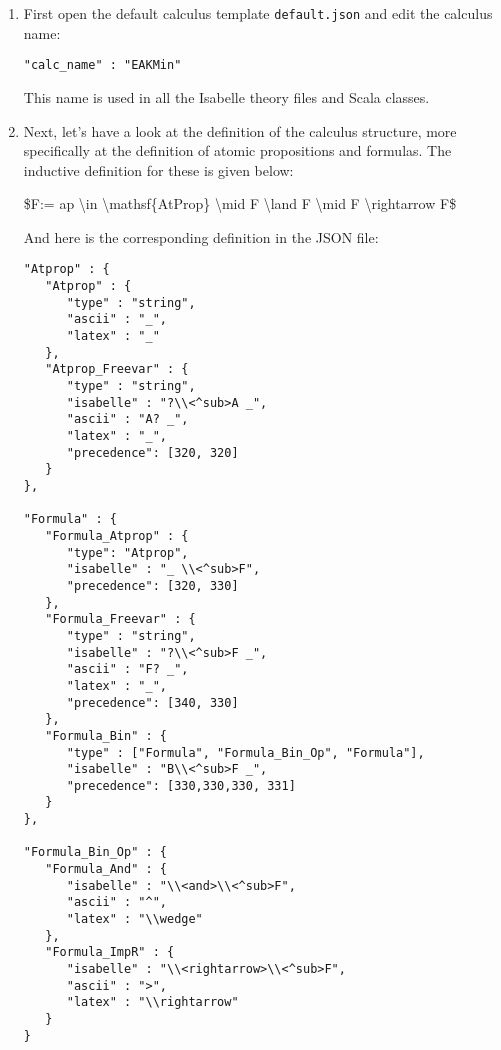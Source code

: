 \begin{enumerate}
\item
  First open the default calculus template \texttt{default.json} and
  edit the calculus name:

\begin{verbatim}
"calc_name" : "EAKMin"
\end{verbatim}

  This name is used in all the Isabelle theory files and Scala classes.
\item
  Next, let's have a look at the definition of the calculus structure,
  more specifically at the definition of atomic propositions and
  formulas. The inductive definition for these is given below:

  \$F:= ap \textbackslash{}in \textbackslash{}mathsf\{AtProp\}
  \textbackslash{}mid F \textbackslash{}land F \textbackslash{}mid F
  \textbackslash{}rightarrow F\$

  And here is the corresponding definition in the JSON file:

\begin{verbatim}
"Atprop" : {
   "Atprop" : {
      "type" : "string",
      "ascii" : "_",
      "latex" : "_"
   },
   "Atprop_Freevar" : {
      "type" : "string",
      "isabelle" : "?\\<^sub>A _",
      "ascii" : "A? _",
      "latex" : "_",
      "precedence": [320, 320]
   }
},

"Formula" : {
   "Formula_Atprop" : {
      "type": "Atprop",
      "isabelle" : "_ \\<^sub>F",
      "precedence": [320, 330]
   },
   "Formula_Freevar" : {
      "type" : "string",
      "isabelle" : "?\\<^sub>F _",
      "ascii" : "F? _",
      "latex" : "_",
      "precedence": [340, 330]
   },
   "Formula_Bin" : {
      "type" : ["Formula", "Formula_Bin_Op", "Formula"],
      "isabelle" : "B\\<^sub>F _",
      "precedence": [330,330,330, 331]
   }
},

"Formula_Bin_Op" : {
   "Formula_And" : {
      "isabelle" : "\\<and>\\<^sub>F",
      "ascii" : "^",
      "latex" : "\\wedge"
   },
   "Formula_ImpR" : {
      "isabelle" : "\\<rightarrow>\\<^sub>F",
      "ascii" : ">",
      "latex" : "\\rightarrow"
   }
}
\end{verbatim}


\end{enumerate}

